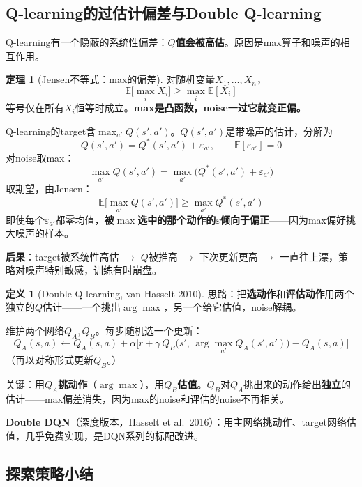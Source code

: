 \documentclass[11pt,a4paper]{article}
\theoremstyle{definition}
\newtheorem{definition}{定义}[section]
\newtheorem{theorem}{定理}[section]
\begin{document}
\subsection{Q-learning的过估计偏差与Double Q-learning}

\begin{plainwords}
Q-learning有一个隐蔽的系统性偏差：\textbf{$Q$值会被高估}。原因是max算子和噪声的相互作用。
\end{plainwords}

\begin{theorem}[Jensen不等式：max的偏差]
对随机变量$X_1, \ldots, X_n$，
\[
\mathbb{E}\Big[\max_i X_i\Big] \geq \max_i \mathbb{E}[X_i]
\]
等号仅在所有$X_i$恒等时成立。\textbf{max是凸函数，noise一过它就变正偏。}
\end{theorem}

\begin{plainwords}[Q-learning为什么过估计]
Q-learning的target含$\max_{a'} Q(s', a')$。$Q(s', a')$是带噪声的估计，分解为
\[
Q(s', a') = Q^*(s', a') + \varepsilon_{a'},\qquad \mathbb{E}[\varepsilon_{a'}] = 0
\]
对noise取max：
\[
\max_{a'} Q(s', a') = \max_{a'}\big(Q^*(s', a') + \varepsilon_{a'}\big)
\]
取期望，由Jensen：
\[
\mathbb{E}\big[\max_{a'} Q(s', a')\big] \geq \max_{a'} Q^*(s', a')
\]
即使每个$\varepsilon_{a'}$都零均值，\textbf{被$\max$选中的那个动作的$\varepsilon$倾向于偏正}——因为max偏好挑大噪声的样本。

\textbf{后果}：target被系统性高估 $\to$ $Q$被推高 $\to$ 下次更新更高 $\to$ 一直往上漂，策略对噪声特别敏感，训练有时崩盘。
\end{plainwords}

\begin{definition}[Double Q-learning, van Hasselt 2010]
思路：把\textbf{选动作}和\textbf{评估动作}用两个独立的$Q$估计——一个挑出$\arg\max$，另一个给它估值，noise解耦。

维护两个网络$Q_A, Q_B$。每步随机选一个更新：
\[
Q_A(s, a) \leftarrow Q_A(s,a) + \alpha\Big[r + \gamma\, Q_B\big(s',\,\arg\max_{a'} Q_A(s', a')\big) - Q_A(s,a)\Big]
\]
（再以对称形式更新$Q_B$。）

关键：用$Q_A$\textbf{挑动作}（$\arg\max$），用$Q_B$\textbf{估值}。$Q_B$对$Q_A$挑出来的动作给出\textbf{独立}的估计——max偏差消失，因为max的noise和评估的noise不再相关。

\textbf{Double DQN}（深度版本，Hasselt et al.\ 2016）：用主网络挑动作、target网络估值，几乎免费实现，是DQN系列的标配改进。
\end{definition}

\subsection{探索策略小结}
\end{document}
